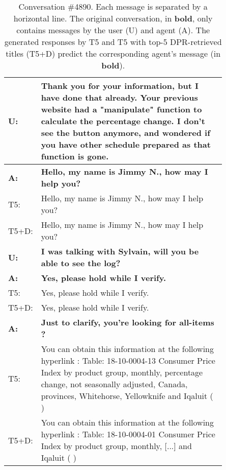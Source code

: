 \documentclass[11pt]{article}
\begin{document}
\begin{table*}[h]
    \small
    \centering
    \begin{tabular}{l p{0.85\linewidth}}
    \toprule
    \textbf{U:} & \textbf{Thank you for your information, but I have done that already. Your previous website had a "manipulate" function to calculate the percentage change. I don't see the button anymore, and wondered if you have other schedule prepared as that function is gone.}
    \\
    \midrule
    \textbf{A:} & \textbf{Hello, my name is Jimmy N., how may I help you?}
    \\
    T5: & Hello, my name is Jimmy N., how may I help you?
    \\
    T5+D: & Hello, my name is Jimmy N., how may I help you?
    \\
    \midrule
    \textbf{U:} & \textbf{I was talking with Sylvain, will you be able to see the log?}
    \\
    \midrule
    \textbf{A:} & \textbf{Yes, please hold while I verify.}
    \\
    T5: & Yes, please hold while I verify.
    \\
    T5+D: & Yes, please hold while I verify.
    \\
    \midrule
    \textbf{A:} & \textbf{Just to clarify, you're looking for all-items ?}
    \\
    T5: & You can obtain this information at the following hyperlink : Table: 18-10-0004-13 Consumer Price Index by product group, monthly, percentage change, not seasonally adjusted, Canada, provinces, Whitehorse, Yellowknife and Iqaluit ( )
    \\
    T5+D: & You can obtain this information at the following hyperlink : Table: 18-10-0004-01 Consumer Price Index by product group, monthly, [...] and Iqaluit ( )
    \\
    \bottomrule
    \end{tabular}
    \caption{Conversation \#4890. Each message is separated by a horizontal line. The original conversation, in \textbf{bold}, only contains messages by the user (U) and agent (A). The generated responses by T5 and T5 with top-5 DPR-retrieved titles (T5+D) predict the corresponding agent's message (in \textbf{bold}).}
    \label{tab:sample_conversation_4890}
\end{table*}
\end{document}
